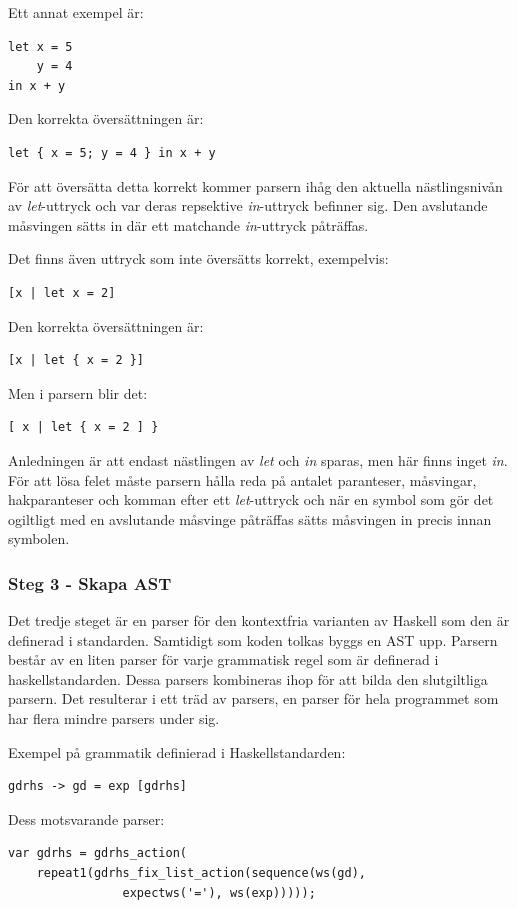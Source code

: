 Ett annat exempel är:
\begin{lstlisting}
let x = 5
    y = 4
in x + y
\end{lstlisting}
Den korrekta översättningen är:
\begin{lstlisting}
let { x = 5; y = 4 } in x + y
\end{lstlisting}
För att översätta detta korrekt kommer parsern ihåg den aktuella nästlingsnivån av \emph{let}-uttryck och var deras repsektive \emph{in}-uttryck befinner sig. 
Den avslutande måsvingen sätts in där ett matchande \emph{in}-uttryck påträffas.

Det finns även uttryck som inte översätts korrekt, exempelvis:
\begin{lstlisting}
[x | let x = 2]
\end{lstlisting}
Den korrekta översättningen är:
\begin{lstlisting}
[x | let { x = 2 }]
\end{lstlisting}
Men i parsern blir det:
\begin{lstlisting}
[ x | let { x = 2 ] }
\end{lstlisting}
Anledningen är att endast nästlingen av \emph{let} och \emph{in} sparas, men här finns inget \emph{in}.
För att lösa felet måste parsern hålla reda på antalet paranteser, måsvingar, hakparanteser och komman efter ett \emph{let}-uttryck och när en symbol som gör det ogiltligt 
med en avslutande måsvinge påträffas sätts måsvingen in precis innan symbolen.

\subsubsection{Steg 3 - Skapa AST}
Det tredje steget är en parser för den kontextfria varianten av Haskell som den är definerad i standarden. 
Samtidigt som koden tolkas byggs en AST upp. Parsern består av en liten parser för varje grammatisk regel som är definerad i haskellstandarden. 
Dessa parsers kombineras ihop för att bilda den slutgiltliga parsern. Det resulterar i ett träd av parsers, en parser för hela programmet som har flera mindre parsers under sig.

Exempel på grammatik definierad i Haskellstandarden:
\begin{lstlisting}
gdrhs -> gd = exp [gdrhs]
\end{lstlisting}
Dess motsvarande parser:
\begin{lstlisting}
var gdrhs = gdrhs_action(
    repeat1(gdrhs_fix_list_action(sequence(ws(gd), 
                expectws('='), ws(exp)))));
\end{lstlisting}

